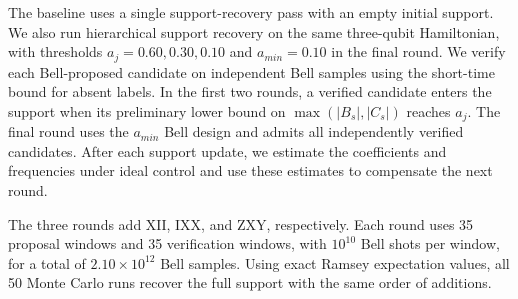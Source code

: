 The baseline uses a single support-recovery pass with an empty initial
support. We also run hierarchical support recovery on the same
three-qubit Hamiltonian, with thresholds \(a_j=0.60,0.30,0.10\) and
\(a_{min}=0.10\) in the final round. We verify each Bell-proposed
candidate on independent Bell samples using the short-time bound for
absent labels. In the first two rounds, a verified candidate enters the
support when its preliminary lower bound on
\(\max(\lvert B_s\rvert,\lvert C_s\rvert)\) reaches \(a_j\).
The final round uses the \(a_{min}\) Bell design and admits all
independently verified candidates. After each support update, we
estimate the coefficients and frequencies under ideal control and use
these estimates to compensate the next round.

The three rounds add \(\mathrm{XII}\), \(\mathrm{IXX}\), and
\(\mathrm{ZXY}\), respectively. Each round uses 35 proposal windows and
35 verification windows, with \(10^{10}\) Bell shots per window, for a
total of \(2.10\times10^{12}\) Bell samples. Using exact Ramsey
expectation values, all 50 Monte Carlo runs recover the full support
with the same order of additions.
